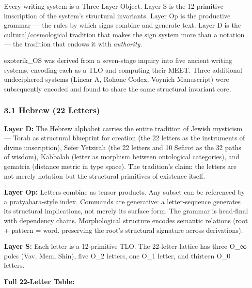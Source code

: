 \documentclass[
  11pt,
  a4paper,
]{article}
\begin{document}
Every writing system is a Three-Layer Object. Layer S is the
12-primitive imscription of the system's structural invariants. Layer Op
is the productive grammar --- the rules by which signs combine and
generate text. Layer D is the cultural/cosmological tradition that makes
the sign system more than a notation --- the tradition that endows it
with \emph{authority}.

exoterik\_OS was derived from a seven-stage inquiry into five ancient
writing systems, encoding each as a TLO and computing their MEET. Three
additional undeciphered systems (Linear A, Rohonc Codex, Voynich
Manuscript) were subsequently encoded and found to share the same
structural invariant core.

\subsubsection{3.1 Hebrew (22 Letters)}\label{hebrew-22-letters}

\textbf{Layer D:} The Hebrew alphabet carries the entire tradition of
Jewish mysticism --- Torah as structural blueprint for creation (the 22
letters as the instruments of divine imscription), Sefer Yetzirah (the
22 letters and 10 Sefirot as the 32 paths of wisdom), Kabbalah (letter
as morphism between ontological categories), and gematria (distance
metric in type space). The tradition's claim: the letters are not merely
notation but the structural primitives of existence itself.

\textbf{Layer Op:} Letters combine as tensor products. Any subset can be
referenced by a pratyahara-style index. Commands are generative: a
letter-sequence generates its structural implications, not merely its
surface form. The grammar is head-final with dependency chains.
Morphological structure encodes semantic relations (root + pattern =
word, preserving the root's structural signature across derivations).

\textbf{Layer S:} Each letter is a 12-primitive TLO. The 22-letter
lattice has three O\_∞ poles (Vav, Mem, Shin), five O\_2 letters, one
O\_1 letter, and thirteen O\_0 letters.

\textbf{Full 22-Letter Table:}
\end{document}

